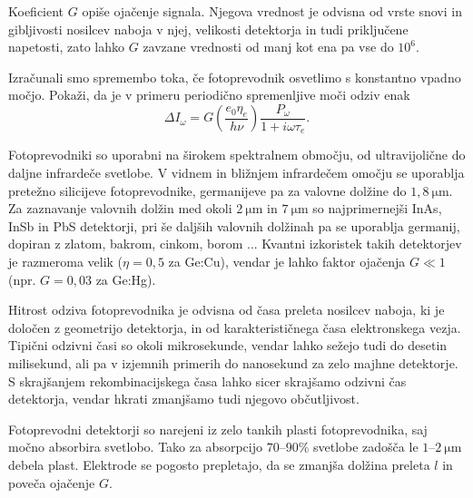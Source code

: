 Koeficient $G$ opiše ojačenje signala. Njegova vrednost je odvisna od 
vrste snovi in gibljivosti nosilcev naboja v njej, velikosti
detektorja in tudi priključene napetosti, zato lahko $G$ zavzane vrednosti od manj kot ena pa
vse do $10^6$. 

\begin{definition}
Izračunali smo spremembo toka, če fotoprevodnik osvetlimo s konstantno vpadno močjo. Pokaži, da
 je v primeru periodično spremenljive moči odziv enak
 \begin{equation}
\Delta I_\omega = G \left( \frac{e_0 \eta_e}{h\nu}\right) \frac{P_\omega}{1+i \omega \tau_e}.
 \end{equation}
 
\end{definition}

Fotoprevodniki so uporabni na širokem spektralnem območju, od ultra\-vijolične 
do daljne infra\-rdeče svetlobe. 
V vidnem in bližnjem infrardečem omočju se 
uporablja pretežno silicijeve fotoprevodnike, germanijeve
pa za valovne dolžine do $1,8~\si{\micro\meter}$. Za zaznavanje valovnih dolžin med okoli 
$2~\si{\micro\meter}$ in $7~\si{\micro\meter}$ so najprimernejši InAs, InSb in PbS detektorji, 
pri še daljših valovnih dolžinah pa se uporablja germanij, dopiran z zlatom, bakrom, cinkom, borom ...
Kvantni izkoristek takih detektorjev je razmeroma velik ($\eta = 0,5$ za Ge:Cu), vendar
je lahko faktor ojačenja $G \ll 1$ (npr. $G = 0,03$ za Ge:Hg). 

Hitrost odziva fotoprevodnika je odvisna od časa preleta nosilcev naboja,
ki je določen z geometrijo detektorja, in od karakterističnega časa elektronskega vezja. 
Tipični odzivni časi so okoli mikrosekunde, vendar lahko sežejo
tudi do desetin milisekund, ali pa v izjemnih primerih do nanosekund za zelo majhne detektorje.
S skrajšanjem rekombinacijskega časa lahko sicer skrajšamo odzivni čas detektorja, 
vendar hkrati zmanjšamo tudi njegovo občutljivost.

\begin{remark}
Fotoprevodni detektorji so narejeni iz zelo tankih plasti fotoprevodnika, saj močno absorbira
svetlobo. Tako za absorpcijo $70$--$90\%$ svetlobe zadošča le $1$--$2~\si{\micro\meter}$ debela plast.
Elektrode se pogosto prepletajo, da se zmanjša dolžina preleta $l$ in poveča ojačenje $G$. 
\end{remark}

